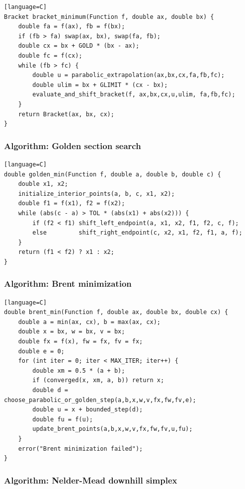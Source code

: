\documentclass[11pt]{article}
\begin{document}
\begin{verbatim}[language=C]
Bracket bracket_minimum(Function f, double ax, double bx) {
    double fa = f(ax), fb = f(bx);
    if (fb > fa) swap(ax, bx), swap(fa, fb);
    double cx = bx + GOLD * (bx - ax);
    double fc = f(cx);
    while (fb > fc) {
        double u = parabolic_extrapolation(ax,bx,cx,fa,fb,fc);
        double ulim = bx + GLIMIT * (cx - bx);
        evaluate_and_shift_bracket(f, ax,bx,cx,u,ulim, fa,fb,fc);
    }
    return Bracket(ax, bx, cx);
}
\end{verbatim}

\subsubsection{Algorithm: Golden section search}\label{algorithm-golden-section-search}

\begin{verbatim}[language=C]
double golden_min(Function f, double a, double b, double c) {
    double x1, x2;
    initialize_interior_points(a, b, c, x1, x2);
    double f1 = f(x1), f2 = f(x2);
    while (abs(c - a) > TOL * (abs(x1) + abs(x2))) {
        if (f2 < f1) shift_left_endpoint(a, x1, x2, f1, f2, c, f);
        else         shift_right_endpoint(c, x2, x1, f2, f1, a, f);
    }
    return (f1 < f2) ? x1 : x2;
}
\end{verbatim}

\subsubsection{Algorithm: Brent minimization}\label{algorithm-brent-minimization}

\begin{verbatim}[language=C]
double brent_min(Function f, double ax, double bx, double cx) {
    double a = min(ax, cx), b = max(ax, cx);
    double x = bx, w = bx, v = bx;
    double fx = f(x), fw = fx, fv = fx;
    double e = 0;
    for (int iter = 0; iter < MAX_ITER; iter++) {
        double xm = 0.5 * (a + b);
        if (converged(x, xm, a, b)) return x;
        double d = choose_parabolic_or_golden_step(a,b,x,w,v,fx,fw,fv,e);
        double u = x + bounded_step(d);
        double fu = f(u);
        update_brent_points(a,b,x,w,v,fx,fw,fv,u,fu);
    }
    error("Brent minimization failed");
}
\end{verbatim}

\subsubsection{Algorithm: Nelder-Mead downhill simplex}\label{algorithm-nelder-mead-downhill-simplex}
\end{document}
